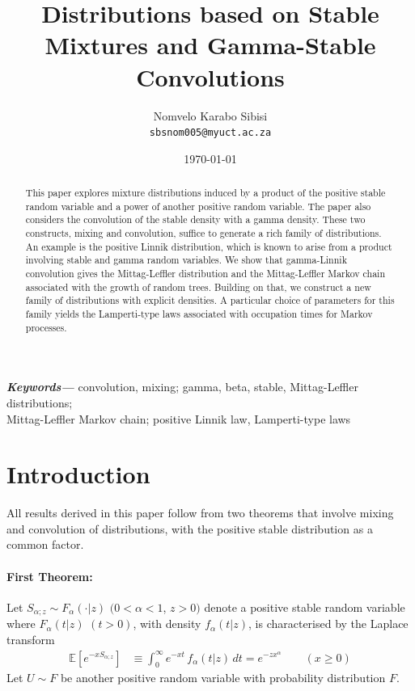 \documentclass[a4paper,12pt]{article}
\title{%
Distributions based on Stable Mixtures and  Gamma-Stable Convolutions}
\author{Nomvelo Karabo Sibisi \\{\small {\tt sbsnom005@myuct.ac.za}}}
\date{\today}
\providecommand{\keywords}[1]
{
  \small	
  \textbf{\textit{Keywords---}} #1
}
\begin{document}
\maketitle
\thispagestyle{empty}


\begin{abstract}
\noindent
This  paper explores mixture distributions induced by a product of the positive  stable random variable
and a  power of another positive random variable. 
The paper also considers the convolution of the stable density with a gamma density. 
These two constructs, mixing and convolution, suffice to generate a rich family of distributions.
An example  is the positive Linnik distribution, which is known to arise from a  product involving stable and gamma random variables.
We show that  gamma-Linnik convolution gives the Mittag-Leffler distribution and %
the Mittag-Leffler Markov chain associated with the growth of random trees.
Building on  that, we construct a new family of distributions with explicit densities.
A particular choice of parameters for this family yields the Lamperti-type laws
 associated with occupation times for  Markov processes.
\end{abstract}
\keywords{convolution, mixing; 
gamma, beta, stable,  Mittag-Leffler distributions; \\ Mittag-Leffler Markov chain;
positive Linnik law, Lamperti-type laws
}
 

\section{Introduction}
\label{sec:introduction}

All results derived in this paper follow from  two theorems that involve  mixing and convolution of distributions,
with the positive stable distribution as a common factor.
\paragraph{First  Theorem:}
Let $S_{\alpha;z}\sim F_\alpha(\cdot \vert z)$  $(0 <\alpha<1$, $z>0)$ 
denote a  positive stable random variable 
where $F_\alpha(t \vert z)$ $(t>0)$, with  density $f_\alpha(t \vert z)$,
is characterised by the Laplace transform
\begin{align}
\mathbb{E}\left[e^{-xS_{\alpha;z}}\right] &\equiv \int_0^\infty e^{-xt} \,  f_\alpha(t\vert z) \, dt = e^{-zx^\alpha} \qquad (x\ge0)
\label{eq:intro_stableLT}
\end{align}
Let $U\sim F$ be another   positive random variable with probability distribution $F$. %
\end{document}
